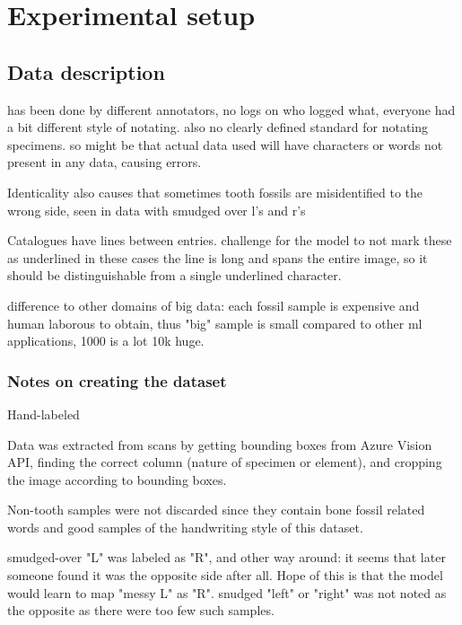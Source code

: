 \documentclass{article}
\begin{document}
\section{Experimental setup}


\subsection{Data description}

has been done by different annotators, no logs on who logged what, everyone 
had a bit different style of notating. also no clearly defined standard 
for notating specimens. so might be that actual data used will have 
characters or words not present in any data, causing errors.


Identicality also causes that sometimes tooth fossils are misidentified to 
the wrong side, seen in data with smudged over l's and r's

Catalogues have lines between entries. challenge for the model to not mark these as underlined
in these cases the line is long and spans the entire image, so it should be distinguishable from 
a single underlined character.

difference to other domains of big data:
each fossil sample is expensive and human laborous to obtain, thus "big" sample is 
small compared to other ml applications, 1000 is a lot 10k huge.

\subsubsection{Notes on creating the dataset}

Hand-labeled

Data was extracted from scans by getting bounding boxes from Azure Vision API,
finding the correct column (nature of specimen or element), and cropping the image 
according to bounding boxes.

Non-tooth samples were not discarded since they contain 
bone fossil related words and good samples of the handwriting style of this dataset.

smudged-over "L" was labeled as "R", and other way around: it seems that later 
someone found it was the opposite side after all. Hope of this is that the model 
would learn to map "messy L" as "R". snudged "left" or "right" was not noted as the 
opposite as there were too few such samples.
\end{document}
